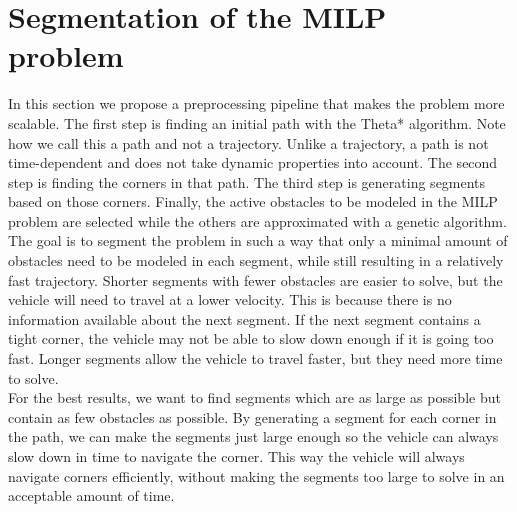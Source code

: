 \section{Segmentation of the MILP problem}
\label{section:segment}
In this section we propose a preprocessing pipeline that makes the problem more scalable. The first step is finding an initial path with the Theta* algorithm. Note how we call this a path and not a trajectory. Unlike a trajectory, a path is not time-dependent and does not take dynamic properties into account. The second step is finding the corners in that path. The third step is generating segments based on those corners. Finally, the active obstacles to be modeled in the MILP problem are selected while the others are approximated with a genetic algorithm. \\
The goal is to segment the problem in such a way that only a minimal amount of obstacles need to be modeled in each segment, while still resulting in a relatively fast trajectory. Shorter segments with fewer obstacles are easier to solve, but the vehicle will need to travel at a lower velocity. This is because there is no information available about the next segment. If the next segment contains a tight corner, the vehicle may not be able to slow down enough if it is going too fast. Longer segments allow the vehicle to travel faster, but they need more time to solve.\\
For the best results, we want to find segments which are as large as possible but contain as few obstacles as possible. By generating a segment for each corner in the path, we can make the segments just large enough so the vehicle can always slow down in time to navigate the corner. This way the vehicle will always navigate corners  efficiently, without making the segments too large to solve in an acceptable amount of time.
